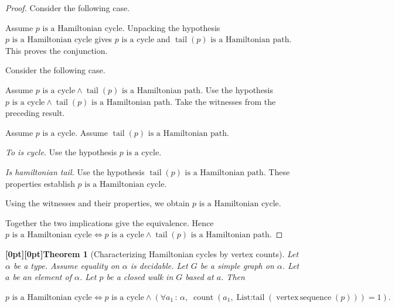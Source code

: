 \documentclass{article}
\makeatletter
\newcommand{\paperanchor}[1]{\hypertarget{#1}{}}%
\def\paperdest{\pdfextension dest}\def\paperstart{\pdfextension startlink}%
\def\paperend{\pdfextension endlink}\def\papercolor{\pdfextension colorstack}%
\let\paperdest\pdfdest\let\paperstart\pdfstartlink\let\paperend\pdfendlink\let\papercolor\pdfcolorstack
\newcommand{\paperanchor}[1]{\paperdest name{#1} xyz}%
\newcommand{\paperanchor}[1]{\special{pdf:dest (#1) [@thispage /XYZ null @ypos null]}}%
\newcommand{\paperlineanchor}[1]{\raisebox{10pt}[0pt][0pt]{\paperanchor{#1}}}
\DeclareRobustCommand{\paperresultname}[1]{\paperlineanchor{theorem:\arabic{theorem}}#1}
\theoremstyle{paperresult}
\newtheorem{theorem}{\paperresultname{Theorem}}
\newenvironment{proofstep}{\par\smallskip\ifdim\leftskip<3em\relax\advance\leftskip by 1em\relax\fi\noindent\ignorespaces}{\par\smallskip}
\makeatother
\begin{document}
\begin{proof}
Consider the following case.
\begin{proofstep}
Assume \(p\text{ is a Hamiltonian cycle}\).
Unpacking the hypothesis \(p\text{ is a Hamiltonian cycle}\) gives \(p\text{ is a cycle}\) and \(\operatorname{tail}(p)\text{ is a Hamiltonian path}\).
This proves the conjunction.
\end{proofstep}
Consider the following case.
\begin{proofstep}
Assume \(p\text{ is a cycle} \land \operatorname{tail}(p)\text{ is a Hamiltonian path}\).
Use the hypothesis \(p\text{ is a cycle} \land \operatorname{tail}(p)\text{ is a Hamiltonian path}\).
Take the witnesses from the preceding result.
\begin{proofstep}
Assume \(p\text{ is a cycle}\).
Assume \(\operatorname{tail}(p)\text{ is a Hamiltonian path}\).
\par\smallskip\noindent\emph{To is cycle.}\enspace
Use the hypothesis \(p\text{ is a cycle}\).
\par\smallskip\noindent\emph{Is hamiltonian tail.}\enspace
Use the hypothesis \(\operatorname{tail}(p)\text{ is a Hamiltonian path}\).
These properties establish \(p\text{ is a Hamiltonian cycle}\).
\end{proofstep}
Using the witnesses and their properties, we obtain \(p\text{ is a Hamiltonian cycle}\).
\end{proofstep}
Together the two implications give the equivalence. Hence \(p\text{ is a Hamiltonian cycle} \iff p\text{ is a cycle} \land \operatorname{tail}(p)\text{ is a Hamiltonian path}\).
\end{proof}

\begin{theorem}[{Characterizing Hamiltonian cycles by vertex counts}]\label{theorem:11}
Let \(\alpha\) be a type. Assume equality on \(\alpha\) is decidable. Let \(G\) be a simple graph on \(\alpha\). Let \(a\) be an element of \(\alpha\). Let \(p\) be a closed walk in \(G\) based at \(a\). Then
\begin{center}
\(\displaystyle p\text{ is a Hamiltonian cycle} \iff p\text{ is a cycle} \land (\forall a_{1}\, :\, \alpha,\; \operatorname{count}(a_{1},\allowbreak{} \operatorname{List\mathord{:}tail}(\operatorname{vertex\,sequence}(p))) = 1).\)
\end{center}
\end{theorem}
\end{document}
